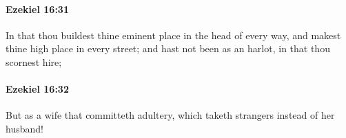 		\paragraph{Ezekiel 16:31} %
			\label{EZEKIEL-16-31}

			In that thou buildest thine eminent place in the head of every way, and makest thine high place in every street; and hast not been as an harlot, in that thou scornest hire;


		\paragraph{Ezekiel 16:32} %
			\label{EZEKIEL-16-32}

			But as a wife that committeth adultery, which taketh strangers instead of her husband!


